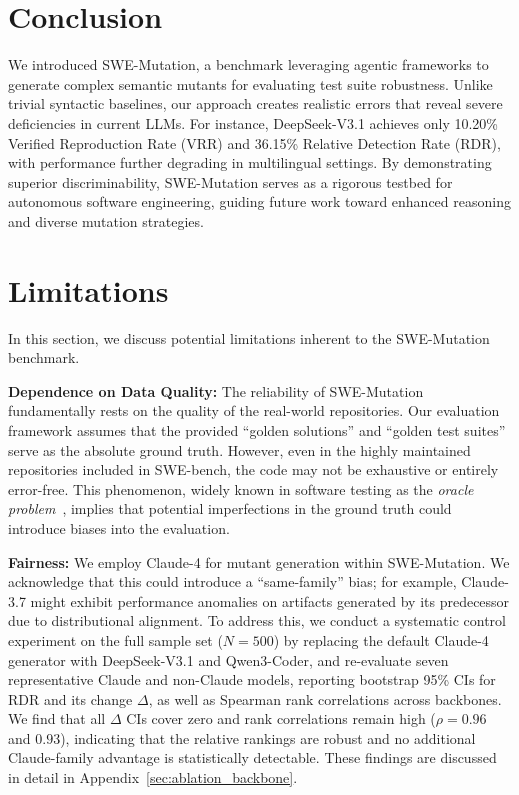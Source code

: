 \documentclass[11pt]{article}
\begin{document}
\section{Conclusion}
We introduced SWE-Mutation, a benchmark leveraging agentic frameworks to generate complex semantic mutants for evaluating test suite robustness. Unlike trivial syntactic baselines, our approach creates realistic errors that reveal severe deficiencies in current LLMs. For instance, DeepSeek-V3.1 achieves only 10.20\% Verified Reproduction Rate (VRR) and 36.15\% Relative Detection Rate (RDR), with performance further degrading in multilingual settings. By demonstrating superior discriminability, SWE-Mutation serves as a rigorous testbed for autonomous software engineering, guiding future work toward enhanced reasoning and diverse mutation strategies.
\section*{Limitations}
In this section, we discuss potential limitations inherent to the SWE-Mutation benchmark.

\textbf{Dependence on Data Quality: }The reliability of SWE-Mutation fundamentally rests on the quality of the real-world repositories. Our evaluation framework assumes that the provided ``golden solutions'' and ``golden test suites'' serve as the absolute ground truth. However, even in the highly maintained repositories included in SWE-bench, the code may not be exhaustive or entirely error-free. This phenomenon, widely known in software testing as the \textit{oracle problem}~\citep{ebetal:oracle}, implies that potential imperfections in the ground truth could introduce biases into the evaluation.

\textbf{Fairness: }We employ Claude-4 for mutant generation within SWE-Mutation. We acknowledge that this could introduce a ``same-family'' bias; for example, Claude-3.7 might exhibit performance anomalies on artifacts generated by its predecessor due to distributional alignment. To address this, we conduct a systematic control experiment on the full sample set ($N=500$) by replacing the default Claude-4 generator with DeepSeek-V3.1 and Qwen3-Coder, and re-evaluate seven representative Claude and non-Claude models, reporting bootstrap 95\% CIs for RDR and its change $\Delta$, as well as Spearman rank correlations across backbones. We find that all $\Delta$ CIs cover zero and rank correlations remain high ($\rho=0.96$ and $0.93$), indicating that the relative rankings are robust and no additional Claude-family advantage is statistically detectable. These findings are discussed in detail in Appendix~\ref{sec:ablation_backbone}.
\end{document}
